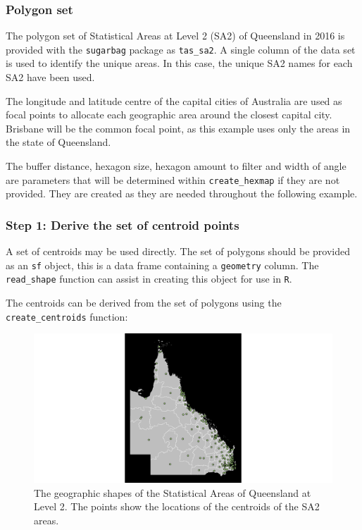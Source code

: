 \documentclass{monashthesis}
\begin{document}
\hypertarget{polygon-set}{%
\subsubsection{Polygon set}\label{polygon-set}}

The polygon set of Statistical Areas at Level 2 (SA2) \autocite{abs2016} of Queensland in 2016 is provided with the \texttt{sugarbag} package as \texttt{tas\_sa2}.
A single column of the data set is used to identify the unique areas.
In this case, the unique SA2 names for each SA2 have been used.

The longitude and latitude centre of the capital cities of Australia are used as focal points to allocate each geographic area around the closest capital city. Brisbane will be the common focal point, as this example uses only the areas in the state of Queensland.

The buffer distance, hexagon size, hexagon amount to filter and width of angle are parameters that will be determined within \texttt{create\_hexmap} if they are not provided. They are created as they are needed throughout the following example.

\hypertarget{step-1-derive-the-set-of-centroid-points}{%
\subsubsection{Step 1: Derive the set of centroid points}\label{step-1-derive-the-set-of-centroid-points}}

A set of centroids may be used directly. The set of polygons should be provided as an \texttt{sf} object, this is a data frame containing a \texttt{geometry} column. The \texttt{read\_shape} function can assist in creating this object for use in \texttt{R}.

The centroids can be derived from the set of polygons using the \texttt{create\_centroids} function:

\begin{figure}[H]
\centering
\includegraphics[width=14cm]{figures/03-algorithm/1centroids.pdf}
\caption{\label{fig:centroids_plot}The geographic shapes of the Statistical Areas of Queensland at Level 2. The points show the locations of the centroids of the SA2 areas.}
\end{figure}
\end{document}
